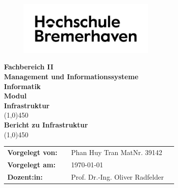 
\thispagestyle{empty}
\begin{figure}[h!]
 \centering
 \includegraphics[width=0.6\textwidth]{src/abbildungen/logoneu.png}
\end{figure}
\begin{center}
\large\textbf{Fachbereich II \\ Management und Informationssysteme}\\
\large\textbf{Informatik}\\
\vspace{1cm}
\large\textbf{Modul\\ Infrastruktur}\\
\vspace*{\fill}
\line(1,0){450}\\
\doublespacing
\textbf{\Large{Bericht zu Infrastruktur}}\\
\line(1,0){450}\\
\end{center}
\vspace*{\fill}
\onehalfspacing
\begin{flushleft}
\begin{tabular}{llll}
\textbf{Vorgelegt von:} & & Phan Huy Tran MatNr. 39142 & \\
\textbf{Vorgelegt am:} & & \today &\\
\textbf{Dozent:in:} & & Prof. Dr.-Ing. Oliver Radfelder  & \\
\end{tabular}
\end{flushleft}
